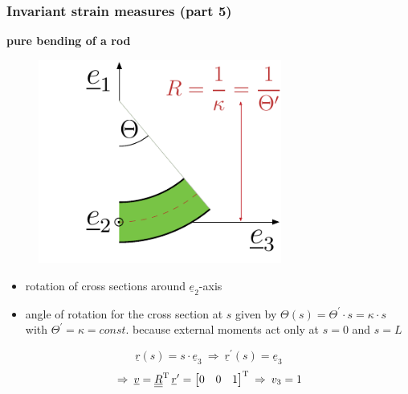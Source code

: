 \begin{frame}
  \frametitle{Invariant strain measures (part 5)}

  \textbf{pure bending of a rod}
  \begin{multicols}{2}
    \noindent
    \begin{figure}
      \centering
      \includegraphics[width=8cm, keepaspectratio=true]{sections/cosserat_rods/images/PureBendingExample}
    \end{figure}
    
    \begin{itemize}
      \item rotation of cross sections around $\underline{e}_2$-axis
      \item angle of rotation for the cross section at $s$ given by $\Theta(s) = \Theta^{\prime} \cdot s = \kappa \cdot s$\newline
        with $\Theta^{\prime} = \kappa = const.$ because external moments act only at $s=0$ and $s=L$
    \end{itemize}
    \vspace{0.1em}
    \begin{displaymath}
      \underline{r}(s) = s \cdot \underline{e}_3 
      \: \Rightarrow \:
      \underline{r}^{\prime}(s) = \underline{e}_3
    \end{displaymath}
    \begin{displaymath}
      \: \Rightarrow \:
      \underline{v} = \underline{\underline{R}}^{\mathrm{T}} \, \underline{r}^{\prime} =
      \begin{bmatrix}
        0 & 0 & 1
      \end{bmatrix}^{\mathrm{T}}
      \: \Rightarrow \:
      v_3 = 1
    \end{displaymath}
    \vspace{0.6em}
  \end{multicols}  


\end{frame}
